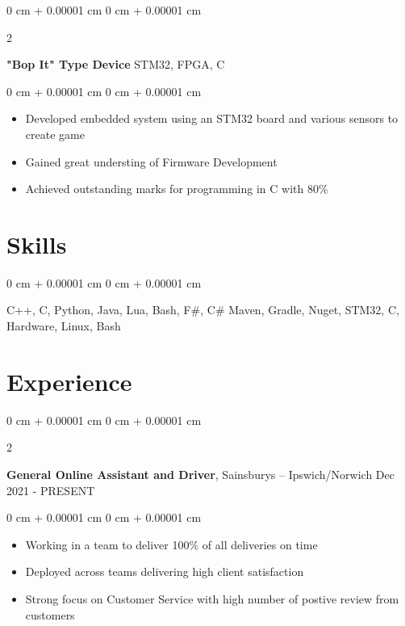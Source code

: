 \documentclass[10pt, letterpaper]{article}
\newenvironment{highlights}{
    \begin{itemize}[
        topsep=0.10 cm,
        parsep=0.10 cm,
        partopsep=0pt,
        itemsep=0pt,
        leftmargin=0 cm + 10pt
    ]
}{
    \end{itemize}
} %
\newenvironment{onecolentry}{
    \begin{adjustwidth}{
        0 cm + 0.00001 cm
    }{
        0 cm + 0.00001 cm
    }
}{
    \end{adjustwidth}
} %
\newenvironment{twocolentry}[2][]{
    \onecolentry
    \def\secondColumn{#2}
    \setcolumnwidth{\fill, 4.5 cm}
    \begin{paracol}{2}
}{
    \switchcolumn \raggedleft \secondColumn
    \end{paracol}
    \endonecolentry
} %
\begin{document}
    \vspace{0.2 cm}

    \begin{twocolentry}{
        STM32, FPGA, C
    }
        \textbf{"Bop It" Type Device}\end{twocolentry}

    \vspace{0.10 cm}
    \begin{onecolentry}
        \begin{highlights}
            \item Developed embedded system using an STM32 board and various sensors to create game 
            \item Gained great understing of Firmware Development
            \item Achieved outstanding marks for programming in C with 80\%
        \end{highlights}
    \end{onecolentry}

    \section{Skills}
    \begin{onecolentry}
        C++, C, Python, Java, Lua, Bash, F\#, C\# Maven, Gradle, Nuget, STM32, C, Hardware, Linux, Bash
    \end{onecolentry}
    \section{Experience}

    \begin{twocolentry}{
        Dec 2021 - PRESENT
    }
        \textbf{General Online Assistant and Driver}, Sainsburys -- Ipswich/Norwich\end{twocolentry}
    \begin{onecolentry}
        \begin{highlights}
            \item Working in a team to deliver 100\% of all deliveries on time 
            \item Deployed across teams delivering high client satisfaction
            \item Strong focus on Customer Service with high number of postive review from customers
        \end{highlights}
    \end{onecolentry}
\end{document}

